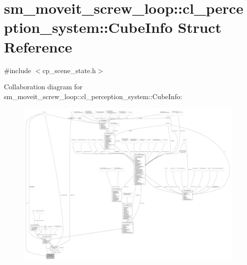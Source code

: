 \hypertarget{structsm__moveit__screw__loop_1_1cl__perception__system_1_1CubeInfo}{}\section{sm\+\_\+moveit\+\_\+screw\+\_\+loop\+:\+:cl\+\_\+perception\+\_\+system\+:\+:Cube\+Info Struct Reference}
\label{structsm__moveit__screw__loop_1_1cl__perception__system_1_1CubeInfo}


{\ttfamily \#include $<$cp\+\_\+scene\+\_\+state.\+h$>$}



Collaboration diagram for sm\+\_\+moveit\+\_\+screw\+\_\+loop\+:\+:cl\+\_\+perception\+\_\+system\+:\+:Cube\+Info\+:
\nopagebreak
\begin{figure}[H]
\begin{center}
\leavevmode
\includegraphics[width=350pt]{structsm__moveit__screw__loop_1_1cl__perception__system_1_1CubeInfo__coll__graph}
\end{center}
\end{figure}

